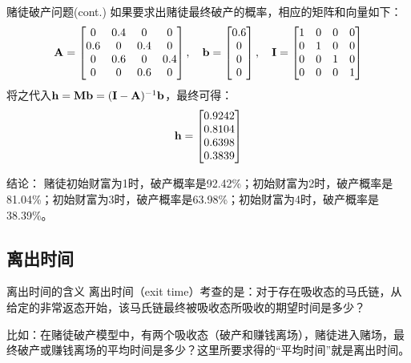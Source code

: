 \documentclass[t]{beamer}
\begin{document}
\begin{frame}{赌徒破产问题(cont.)}\small
    如果要求出赌徒最终破产的概率，相应的矩阵和向量如下：
    \[{\bf A}=\begin{bmatrix}
    0 & 0.4 & 0 & 0\\
     0.6 & 0 & 0.4 & 0\\
     0 & 0.6 & 0 & 0.4 \\
    0 & 0 & 0.6 & 0
    \end{bmatrix},\quad {\bf b}=\begin{bmatrix}
    0.6\\ 0\\0\\0
    \end{bmatrix},\quad {\bf I}=\begin{bmatrix}
    1&0&0&0\\
    0&1&0&0\\
    0&0&1&0\\
    0&0&0&1\\
    \end{bmatrix}  \]
    将之代入${\bf h}={\bf M}{\bf b}=({\bf I}-{\bf A})^{-1}{\bf b}$，最终可得：
    \[{\bf h}=\begin{bmatrix}
    0.9242\\
    0.8104\\
    0.6398\\
    0.3839\\
    \end{bmatrix} \]

    \begin{block}{结论：}
        赌徒初始财富为1时，破产概率是92.42\%；初始财富为2时，破产概率是81.04\%；初始财富为3时，破产概率是63.98\%；初始财富为4时，破产概率是38.39\%。
    \end{block}
\end{frame}


\subsection{离出时间}
\begin{frame}{离出时间的含义}
    离出时间（exit time）考查的是：对于存在吸收态的马氏链，从给定的非常返态开始，该马氏链最终被吸收态所吸收的{期望时间}是多少？

    比如：在赌徒破产模型中，有两个吸收态（破产和赚钱离场），赌徒进入赌场，最终破产或赚钱离场的平均时间是多少？这里所要求得的“平均时间”就是离出时间。
\end{frame}
\end{document}
